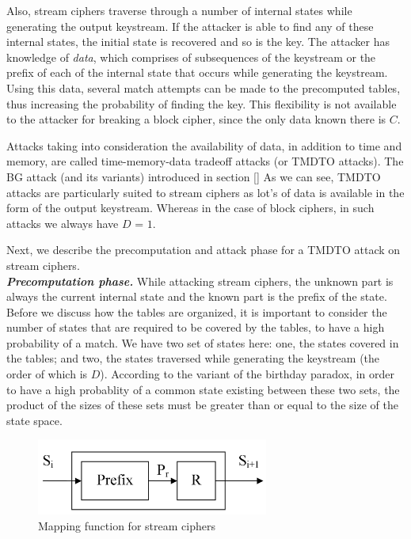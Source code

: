 Also, stream ciphers traverse through a number of internal states while generating the output keystream. If the attacker is able to find any of these internal states, the initial state is recovered and so is the key. The attacker has knowledge of \emph{data}, which comprises of subsequences of the keystream or the prefix of each of the internal state that occurs while generating the keystream. Using this data, several match attempts can be made to the precomputed tables, thus increasing the probability of finding the key. This flexibility is not available to the attacker for breaking a block cipher, since the only data known there is $C$. 

Attacks taking into consideration the availability of data, in addition to time and memory, are called time-memory-data tradeoff attacks (or TMDTO attacks). The BG attack (and its variants) introduced in section \ref{} As we can see, TMDTO attacks are particularly suited to stream ciphers as lot's of data is available in the form of the output keystream. Whereas in the case of block ciphers, in such attacks we always have $D$ = $1$. 

Next, we describe the precomputation and attack phase for a TMDTO attack on stream ciphers.\\

\noindent \textit{\textbf{Precomputation phase.}} While attacking stream ciphers, the unknown part is always the current internal state and the known part is the prefix of the state. Before we discuss how the tables are organized, it is important to consider the number of states that are required to be covered by the tables, to have a high probability of a match. We have two set of states here: one, the states covered in the tables; and two, the states traversed while generating the keystream (the order of which is $D$). According to the variant of the birthday paradox, in order to have a high probablity of a common state existing between these two sets, the product of the sizes of these sets must be greater than or equal to the size of the state space. 

\begin{figure}[ht!]
	\centering
		\includegraphics[width=3in]{./figures/mapping-function-stream.PNG}
	\caption{Mapping function for stream ciphers}	
	\label{fig:mapping-function-stream}
\end{figure}

